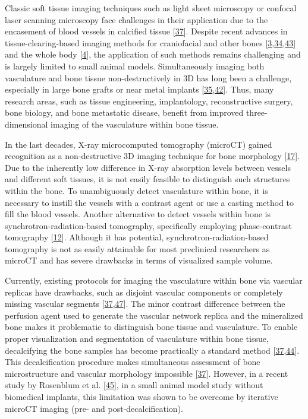 Classic soft tissue imaging techniques such as light sheet microscopy or confocal laser scanning microscopy face challenges in their application due to the encasement of blood vessels in calcified tissue {[}\protect\hyperlink{ref-117R9ULnv}{37}{]}.
Despite recent advances in tissue-clearing-based imaging methods for craniofacial and other bones {[}\protect\hyperlink{ref-ZGzobRpX}{3},\protect\hyperlink{ref-X0aG1K2m}{34},\protect\hyperlink{ref-DiX3YTwQ}{43}{]} and the whole body {[}\protect\hyperlink{ref-BNZSaEBe}{4}{]}, the application of such methods remains challenging and is largely limited to small animal models.
Simultaneously imaging both vasculature and bone tissue non-destructively in 3D has long been a challenge, especially in large bone grafts or near metal implants {[}\protect\hyperlink{ref-1FUMXJVtA}{35},\protect\hyperlink{ref-Vu36g0cK}{42}{]}.
Thus, many research areas, such as tissue engineering, implantology, reconstructive surgery, bone biology, and bone metastatic disease, benefit from improved three-dimensional imaging of the vasculature within bone tissue.

In the last decades, X-ray microcomputed tomography (microCT) gained recognition as a non-destructive 3D imaging technique for bone morphology {[}\protect\hyperlink{ref-KjvwGWK2}{17}{]}.
Due to the inherently low difference in X-ray absorption levels between vessels and different soft tissues, it is not easily feasible to distinguish such structures within the bone.
To unambiguously detect vasculature within bone, it is necessary to instill the vessels with a contrast agent or use a casting method to fill the blood vessels.
Another alternative to detect vessels within bone is synchrotron-radiation-based tomography, specifically employing phase-contrast tomography {[}\protect\hyperlink{ref-ayR0xQaX}{12}{]}.
Although it has potential, synchrotron-radiation-based tomography is not as easily attainable for most preclinical researchers as microCT and has severe drawbacks in terms of visualized sample volume.

Currently, existing protocols for imaging the vasculature within bone via vascular replicas have drawbacks, such as disjoint vascular components or completely missing vascular segments {[}\protect\hyperlink{ref-117R9ULnv}{37},\protect\hyperlink{ref-168Ee16HU}{47}{]}.
The minor contrast difference between the perfusion agent used to generate the vascular network replica and the mineralized bone makes it problematic to distinguish bone tissue and vasculature.
To enable proper visualization and segmentation of vasculature within bone tissue, decalcifying the bone samples has become practically a standard method {[}\protect\hyperlink{ref-117R9ULnv}{37},\protect\hyperlink{ref-AHsHFIUt}{44}{]}.
This decalcification procedure makes simultaneous assessment of bone microstructure and vascular morphology impossible {[}\protect\hyperlink{ref-117R9ULnv}{37}{]}.
However, in a recent study by Rosenblum et al. {[}\protect\hyperlink{ref-yP3RkDdM}{45}{]}, in a small animal model study without biomedical implants, this limitation was shown to be overcome by iterative microCT imaging (pre- and post-decalcification).

